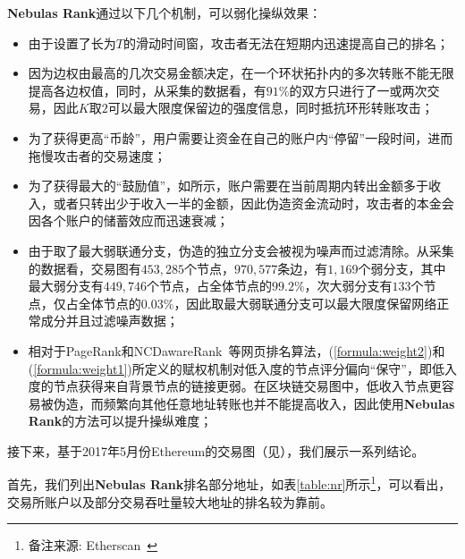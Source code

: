\textbf{Nebulas Rank}通过以下几个机制，可以弱化操纵效果：
\begin{itemize}
	\item 由于设置了长为$T$的滑动时间窗，攻击者无法在短期内迅速提高自己的排名；
	\item 因为边权由最高的几次交易金额决定，在一个环状拓扑内的多次转账不能无限提高各边权值，同时，从采集的数据看，有$91\%$的双方只进行了一或两次交易，因此$K$取$2$可以最大限度保留边的强度信息，同时抵抗环形转账攻击；
	\item 为了获得更高“币龄”，用户需要让资金在自己的账户内“停留”一段时间，进而拖慢攻击者的交易速度；
	\item 为了获得最大的“鼓励值”，如所示，账户需要在当前周期内转出金额多于收入，或者只转出少于收入一半的金额，因此伪造资金流动时，攻击者的本金会因各个账户的储蓄效应而迅速衰减；
	\item 由于取了最大弱联通分支，伪造的独立分支会被视为噪声而过滤清除。从采集的数据看，交易图有$453,285$个节点，$970,577$条边，有$1,169$个弱分支，其中最大弱分支有$449,746$个节点，占全体节点的$99.2\%$，次大弱分支有$133$个节点，仅占全体节点的$0.03\%$，因此取最大弱联通分支可以最大限度保留网络正常成分并且过滤噪声数据；
	\item 相对于PageRank和NCDawareRank~\cite{Nikolakopoulos2013}等网页排名算法，(\ref{formula:weight2})和(\ref{formula:weight1})所定义的赋权机制对低入度的节点评分偏向“保守”，即低入度的节点获得来自背景节点的链接更弱。在区块链交易图中，低收入节点更容易被伪造，而频繁向其他任意地址转账也并不能提高收入，因此使用\textbf{Nebulas Rank}的方法可以提升操纵难度；
\end{itemize}

接下来，基于2017年5月份Ethereum的交易图（见），我们展示一系列结论。

首先，我们列出\textbf{Nebulas Rank}排名部分地址，如表\ref{table:nr}所示\footnote{备注来源: Etherscan~\cite{etherscan}}，可以看出，交易所账户以及部分交易吞吐量较大地址的排名较为靠前。

\newpage

